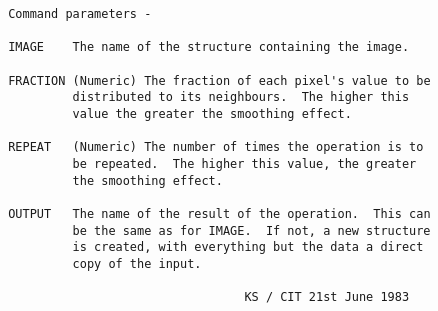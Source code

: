 \begin{description}
\begin{verbatim}
 Command parameters -

 IMAGE    The name of the structure containing the image.

 FRACTION (Numeric) The fraction of each pixel's value to be
          distributed to its neighbours.  The higher this
          value the greater the smoothing effect.

 REPEAT   (Numeric) The number of times the operation is to
          be repeated.  The higher this value, the greater
          the smoothing effect.

 OUTPUT   The name of the result of the operation.  This can
          be the same as for IMAGE.  If not, a new structure
          is created, with everything but the data a direct
          copy of the input.

                                  KS / CIT 21st June 1983
\end{verbatim}
\end{description}
